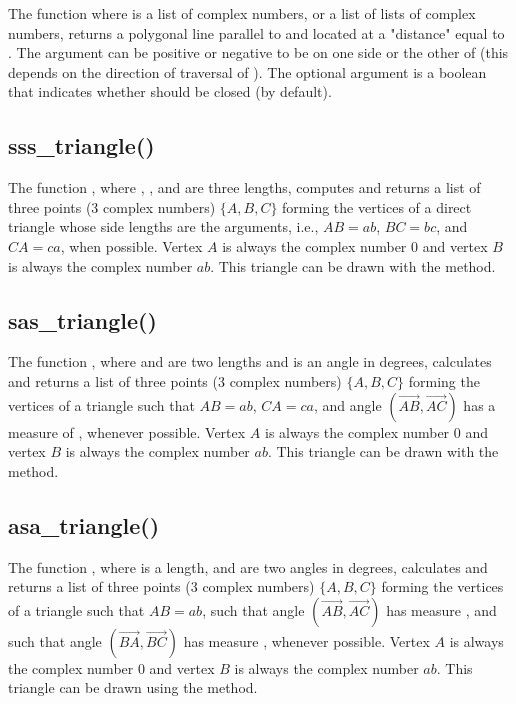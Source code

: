 The function  where  is a list of complex numbers, or a list of lists of complex numbers, returns a polygonal line parallel to  and located at a "distance" equal to . The argument  can be positive or negative to be on one side or the other of  (this depends on the direction of traversal of ). The optional argument  is a boolean that indicates whether  should be closed (\false by default).


\subsection{sss\_triangle()}

The function , where , , and  are three lengths, computes and returns a list of three points (3 complex numbers) $\{A,B,C\}$ forming the vertices of a direct triangle whose side lengths are the arguments, i.e., $AB=ab$, $BC=bc$, and $CA=ca$, when possible. Vertex $A$ is always the complex number $0$ and vertex $B$ is always the complex number $ab$. This triangle can be drawn with the  method.

\subsection{sas\_triangle()}

The function , where  and  are two lengths and  is an angle in degrees, calculates and returns a list of three points (3 complex numbers) $\{A,B,C\}$ forming the vertices of a triangle such that $AB=ab$, $CA=ca$, and angle $(\vec{AB},\vec{AC})$ has a measure of , whenever possible. Vertex $A$ is always the complex number $0$ and vertex $B$ is always the complex number $ab$. This triangle can be drawn with the  method.

\subsection{asa\_triangle()}

The function , where  is a length,  and  are two angles in degrees, calculates and returns a list of three points (3 complex numbers) $\{A,B,C\}$ forming the vertices of a triangle such that $AB=ab$, such that angle $(\vec{AB},\vec{AC})$ has measure , and such that angle $(\vec{BA},\vec{BC})$ has measure , whenever possible. Vertex $A$ is always the complex number $0$ and vertex $B$ is always the complex number $ab$.  This triangle can be drawn using the  method.

